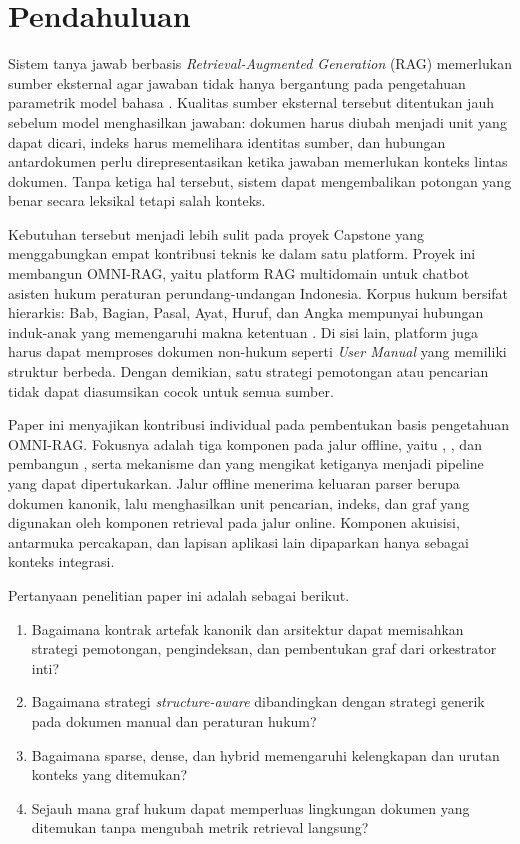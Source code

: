 \section{Pendahuluan}

Sistem tanya jawab berbasis \textit{Retrieval-Augmented Generation} (RAG) memerlukan sumber eksternal agar jawaban tidak hanya bergantung pada pengetahuan parametrik model bahasa \cite{lewisRetrievalAugmentedGenerationKnowledgeIntensive2021,huangSurveyRetrievalAugmentedText2024}. Kualitas sumber eksternal tersebut ditentukan jauh sebelum model menghasilkan jawaban: dokumen harus diubah menjadi unit yang dapat dicari, indeks harus memelihara identitas sumber, dan hubungan antardokumen perlu direpresentasikan ketika jawaban memerlukan konteks lintas dokumen. Tanpa ketiga hal tersebut, sistem dapat mengembalikan potongan yang benar secara leksikal tetapi salah konteks.

Kebutuhan tersebut menjadi lebih sulit pada proyek Capstone yang menggabungkan empat kontribusi teknis ke dalam satu platform. Proyek ini membangun OMNI-RAG, yaitu platform RAG multidomain untuk chatbot asisten hukum peraturan perundang-undangan Indonesia. Korpus hukum bersifat hierarkis: Bab, Bagian, Pasal, Ayat, Huruf, dan Angka mempunyai hubungan induk-anak yang memengaruhi makna ketentuan \cite{uuPembentukanPeraturan2011}. Di sisi lain, platform juga harus dapat memproses dokumen non-hukum seperti \textit{User Manual} yang memiliki struktur berbeda. Dengan demikian, satu strategi pemotongan atau pencarian tidak dapat diasumsikan cocok untuk semua sumber.

Paper ini menyajikan kontribusi individual pada pembentukan basis pengetahuan OMNI-RAG. Fokusnya adalah tiga komponen pada jalur offline, yaitu \chunker, \indexer, dan pembangun \kg{}, serta mekanisme \plugin{} dan \profile{} yang mengikat ketiganya menjadi pipeline yang dapat dipertukarkan. Jalur offline menerima keluaran parser berupa dokumen kanonik, lalu menghasilkan unit pencarian, indeks, dan graf yang digunakan oleh komponen retrieval pada jalur online. Komponen akuisisi, antarmuka percakapan, dan lapisan aplikasi lain dipaparkan hanya sebagai konteks integrasi.

Pertanyaan penelitian paper ini adalah sebagai berikut.
\begin{enumerate}
  \item Bagaimana kontrak artefak kanonik dan arsitektur \plugin{} dapat memisahkan strategi pemotongan, pengindeksan, dan pembentukan graf dari orkestrator inti?
  \item Bagaimana strategi \textit{structure-aware} dibandingkan dengan strategi generik pada dokumen manual dan peraturan hukum?
  \item Bagaimana sparse, dense, dan hybrid \indexer{} memengaruhi kelengkapan dan urutan konteks yang ditemukan?
  \item Sejauh mana graf hukum dapat memperluas lingkungan dokumen yang ditemukan tanpa mengubah metrik retrieval langsung?
\end{enumerate}

